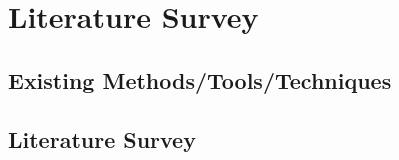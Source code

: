 \chapter{Literature Survey}

\section{Existing Methods/Tools/Techniques}

\section{Literature Survey}
